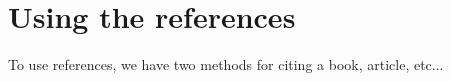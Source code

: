 \section{Using the references}

To use references, we have two methods for citing a book, article, etc...


